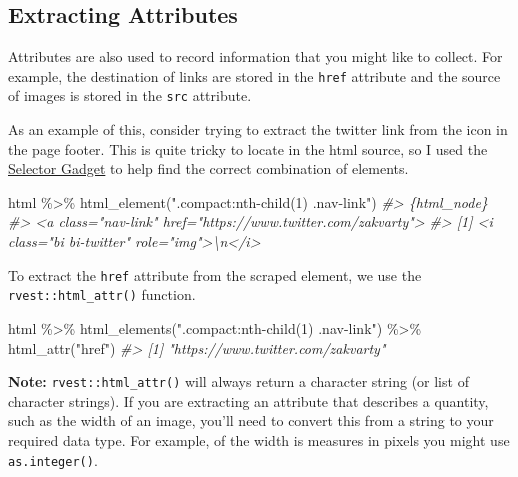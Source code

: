 \documentclass[
  12pt,
]{book}
\newenvironment{Shaded}{\begin{snugshade}}{\end{snugshade}}
\newcommand{\CommentTok}[1]{\textcolor[rgb]{0.56,0.35,0.01}{\textit{#1}}}
\newcommand{\FunctionTok}[1]{\textcolor[rgb]{0.00,0.00,0.00}{#1}}
\newcommand{\NormalTok}[1]{#1}
\newcommand{\SpecialCharTok}[1]{\textcolor[rgb]{0.00,0.00,0.00}{#1}}
\newcommand{\StringTok}[1]{\textcolor[rgb]{0.31,0.60,0.02}{#1}}
\begin{document}
\hypertarget{extracting-attributes}{%
\subsection{Extracting Attributes}\label{extracting-attributes}}

Attributes are also used to record information that you might like to collect. For example, the destination of links are stored in the \texttt{href} attribute and the source of images is stored in the \texttt{src} attribute.

As an example of this, consider trying to extract the twitter link from the icon in the page footer. This is quite tricky to locate in the html source, so I used the \href{https://rvest.tidyverse.org/articles/selectorgadget.html}{Selector Gadget} to help find the correct combination of elements.

\begin{Shaded}
\begin{Highlighting}[]
\NormalTok{html }\SpecialCharTok{\%\textgreater{}\%} \FunctionTok{html\_element}\NormalTok{(}\StringTok{".compact:nth{-}child(1) .nav{-}link"}\NormalTok{)}
\CommentTok{\#\textgreater{} \{html\_node\}}
\CommentTok{\#\textgreater{} \textless{}a class="nav{-}link" href="https://www.twitter.com/zakvarty"\textgreater{}}
\CommentTok{\#\textgreater{} [1] \textless{}i class="bi bi{-}twitter" role="img"\textgreater{}\textbackslash{}n\textless{}/i\textgreater{}}
\end{Highlighting}
\end{Shaded}

To extract the \texttt{href} attribute from the scraped element, we use the \texttt{rvest::html\_attr()} function.

\begin{Shaded}
\begin{Highlighting}[]
\NormalTok{html }\SpecialCharTok{\%\textgreater{}\%} 
  \FunctionTok{html\_elements}\NormalTok{(}\StringTok{".compact:nth{-}child(1) .nav{-}link"}\NormalTok{) }\SpecialCharTok{\%\textgreater{}\%} 
  \FunctionTok{html\_attr}\NormalTok{(}\StringTok{"href"}\NormalTok{)}
\CommentTok{\#\textgreater{} [1] "https://www.twitter.com/zakvarty"}
\end{Highlighting}
\end{Shaded}

\textbf{Note:} \texttt{rvest::html\_attr()} will always return a character string (or list of character strings). If you are extracting an attribute that describes a quantity, such as the width of an image, you'll need to convert this from a string to your required data type. For example, of the width is measures in pixels you might use \texttt{as.integer()}.
\end{document}
